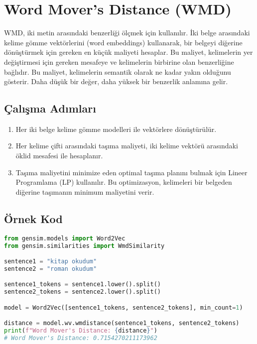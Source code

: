 \section{Word Mover's Distance (WMD)}

WMD, iki metin arasındaki benzerliği ölçmek için kullanılır. İki belge arasındaki kelime gömme vektörlerini (word embeddings) kullanarak, bir belgeyi diğerine dönüştürmek için gereken en küçük maliyeti hesaplar. Bu maliyet, kelimelerin yer değiştirmesi için gereken mesafeye ve kelimelerin birbirine olan benzerliğine bağlıdır. Bu maliyet, kelimelerin semantik olarak ne kadar yakın olduğunu gösterir. Daha düşük bir değer, daha yüksek bir benzerlik anlamına gelir.

\subsection{Çalışma Adımları}

\begin{enumerate}
    \item Her iki belge kelime gömme modelleri ile vektörlere dönüştürülür.
    \item Her kelime çifti arasındaki taşıma maliyeti, iki kelime vektörü arasındaki öklid mesafesi ile hesaplanır.
    \item Taşıma maliyetini minimize eden optimal taşıma planını bulmak için Lineer Programlama (LP) kullanılır. Bu optimizasyon, kelimeleri bir belgeden diğerine taşımanın minimum maliyetini verir.
\end{enumerate}

\subsection{Örnek Kod}

\begin{lstlisting}[language=Python]
from gensim.models import Word2Vec
from gensim.similarities import WmdSimilarity

sentence1 = "kitap okudum"
sentence2 = "roman okudum"

sentence1_tokens = sentence1.lower().split()
sentence2_tokens = sentence2.lower().split()

model = Word2Vec([sentence1_tokens, sentence2_tokens], min_count=1)

distance = model.wv.wmdistance(sentence1_tokens, sentence2_tokens)
print(f"Word Mover's Distance: {distance}")
# Word Mover's Distance: 0.7154270211173962
\end{lstlisting}

\newpage